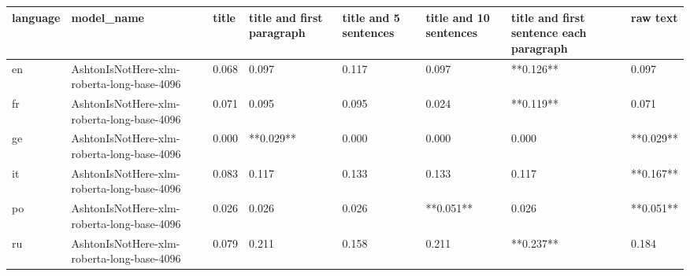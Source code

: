 \begin{tabular}{llllllll}
\toprule
language &                                 model\_name & title & title and first paragraph & title and 5 sentences & title and 10 sentences & title and first sentence each paragraph &  raw text \\
\midrule
      en & AshtonIsNotHere-xlm-roberta-long-base-4096 & 0.068 &                     0.097 &                 0.117 &                  0.097 &                               **0.126** &     0.097 \\
      fr & AshtonIsNotHere-xlm-roberta-long-base-4096 & 0.071 &                     0.095 &                 0.095 &                  0.024 &                               **0.119** &     0.071 \\
      ge & AshtonIsNotHere-xlm-roberta-long-base-4096 & 0.000 &                 **0.029** &                 0.000 &                  0.000 &                                   0.000 & **0.029** \\
      it & AshtonIsNotHere-xlm-roberta-long-base-4096 & 0.083 &                     0.117 &                 0.133 &                  0.133 &                                   0.117 & **0.167** \\
      po & AshtonIsNotHere-xlm-roberta-long-base-4096 & 0.026 &                     0.026 &                 0.026 &              **0.051** &                                   0.026 & **0.051** \\
      ru & AshtonIsNotHere-xlm-roberta-long-base-4096 & 0.079 &                     0.211 &                 0.158 &                  0.211 &                               **0.237** &     0.184 \\
\bottomrule
\end{tabular}
